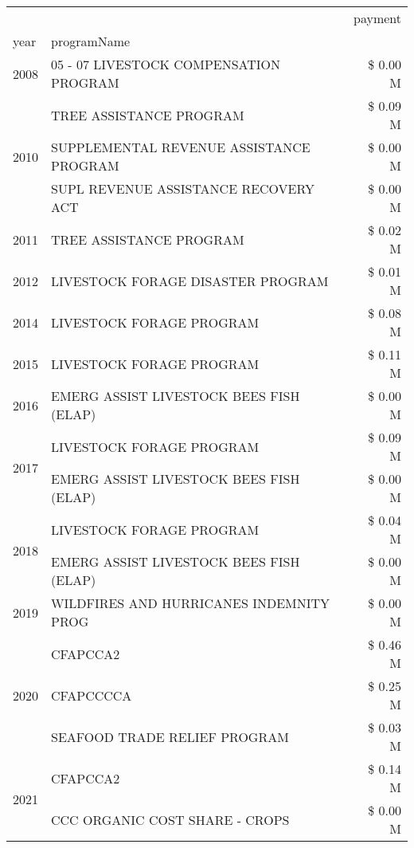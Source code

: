 \begin{tabular}{llr}
\toprule
 &  & payment \\
year & programName &  \\
\midrule
2008 & 05 - 07 LIVESTOCK COMPENSATION PROGRAM & \$ 0.00 M \\
\cline{1-3}
\multirow[t]{3}{*}{2010} & TREE ASSISTANCE PROGRAM & \$ 0.09 M \\
 & SUPPLEMENTAL REVENUE ASSISTANCE PROGRAM & \$ 0.00 M \\
 & SUPL REVENUE ASSISTANCE RECOVERY ACT & \$ 0.00 M \\
\cline{1-3}
2011 & TREE ASSISTANCE PROGRAM & \$ 0.02 M \\
\cline{1-3}
2012 & LIVESTOCK FORAGE DISASTER PROGRAM & \$ 0.01 M \\
\cline{1-3}
2014 & LIVESTOCK FORAGE PROGRAM & \$ 0.08 M \\
\cline{1-3}
2015 & LIVESTOCK FORAGE PROGRAM & \$ 0.11 M \\
\cline{1-3}
2016 & EMERG ASSIST LIVESTOCK BEES FISH (ELAP)       & \$ 0.00 M \\
\cline{1-3}
\multirow[t]{2}{*}{2017} & LIVESTOCK FORAGE PROGRAM & \$ 0.09 M \\
 & EMERG ASSIST LIVESTOCK BEES FISH (ELAP) & \$ 0.00 M \\
\cline{1-3}
\multirow[t]{2}{*}{2018} & LIVESTOCK FORAGE PROGRAM & \$ 0.04 M \\
 & EMERG ASSIST LIVESTOCK BEES FISH (ELAP) & \$ 0.00 M \\
\cline{1-3}
2019 & WILDFIRES AND HURRICANES INDEMNITY PROG & \$ 0.00 M \\
\cline{1-3}
\multirow[t]{3}{*}{2020} & CFAPCCA2 & \$ 0.46 M \\
 & CFAPCCCCA & \$ 0.25 M \\
 & SEAFOOD TRADE RELIEF PROGRAM & \$ 0.03 M \\
\cline{1-3}
\multirow[t]{2}{*}{2021} & CFAPCCA2 & \$ 0.14 M \\
 & CCC ORGANIC COST SHARE - CROPS & \$ 0.00 M \\
\cline{1-3}
\bottomrule
\end{tabular}

